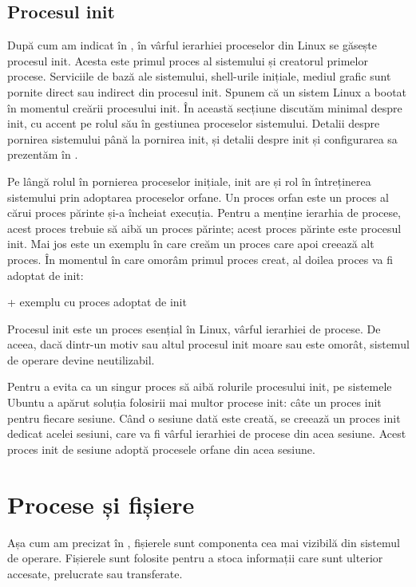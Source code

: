 \subsection{Procesul init}
\label{sec:procese-ierarhie-init}

După cum am indicat în ,
în vârful ierarhiei proceselor din Linux se găsește procesul init. Acesta este
primul proces al sistemului și creatorul primelor procese. Serviciile de bază
ale sistemului, shell-urile inițiale, mediul grafic sunt pornite direct sau
indirect din procesul init. Spunem că un sistem Linux a bootat în momentul
creării procesului init. În această secțiune discutăm minimal despre init, cu
accent pe rolul său în gestiunea proceselor sistemului. Detalii despre pornirea
sistemului până la pornirea init, și detalii despre init și configurarea sa
prezentăm în .

Pe lângă rolul în pornierea proceselor inițiale, init are și rol în întreținerea
sistemului prin adoptarea proceselor orfane. Un proces orfan este un proces al
cărui proces părinte și-a încheiat execuția. Pentru a menține ierarhia de
procese, acest proces trebuie să aibă un proces părinte; acest proces părinte
este procesul init. Mai jos este un exemplu în care creăm un proces care apoi
creează alt proces. În momentul în care omorâm primul proces creat, al doilea
proces va fi adoptat de init:

+ exemplu cu proces adoptat de init

Procesul init este un proces esențial în Linux, vârful ierarhiei de procese. De
aceea, dacă dintr-un motiv sau altul procesul init moare sau este omorât,
sistemul de operare devine neutilizabil.

Pentru a evita ca un singur proces să aibă rolurile procesului init, pe
sistemele Ubuntu a apărut soluția folosirii mai multor procese init: câte un
proces init pentru fiecare sesiune. Când o sesiune dată este creată, se creează
un proces init dedicat acelei sesiuni, care va fi vârful ierarhiei de procese
din acea sesiune. Acest proces init de sesiune adoptă procesele orfane din acea
sesiune.

\section{Procese și fișiere}
\label{sec:procese-fisiere}

Așa cum am precizat în ,
fișierele sunt componenta cea mai vizibilă din sistemul de operare. Fișierele
sunt folosite pentru a stoca informații care sunt ulterior accesate, prelucrate
sau transferate.

